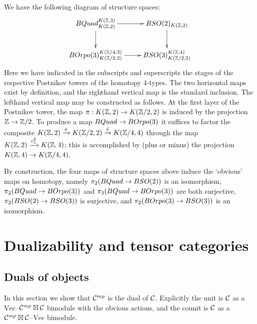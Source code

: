 \documentclass{amsart}
\begin{document}
We have the following diagram of structure spaces:
\begin{equation} \nn
\xymatrix{
BQuad_{K(\ZZ,2)}^{K(\ZZ,3)} \ar[r] \ar[d] & BSO(2)_{K(\ZZ,2)} \ar[d] \\
BOrpo(3)_{K(\ZZ/2,2)}^{K(\ZZ/4,3)} \ar[r] & BSO(3)_{K(\ZZ/2,2)}^{K(\ZZ,4)}
}
\end{equation}
Here we have indicated in the subscripts and superscripts the stages of the respective Postnikov towers of the homotopy 4-types.  The two horizontal maps exist by definition, and the righthand vertical map is the standard inclusion.  The lefthand vertical map may be constructed as follows.  At the first layer of the Postnikov tower, the map $\pi: K(\mathbb Z,2) \rightarrow K(\mathbb Z/2,2)$ is induced by the projection $\mathbb Z \rightarrow \mathbb Z/2$.  To produce a map $BQuad \rightarrow BOrpo(3)$ it suffices to factor the composite $K(\mathbb Z,2) \xrightarrow{\pi} K(\mathbb Z/2,2) \xrightarrow{\delta} K(\mathbb Z/4,4)$ through the map $K(\mathbb Z,2) \xrightarrow{c_1^2} K(\mathbb Z,4)$; this is accomplished by (plus or minus) the projection $K(\mathbb Z,4) \rightarrow K(\mathbb Z/4,4)$.  %

By construction, the four maps of structure spaces above induce the `obvious' maps on homotopy, namely $\pi_2(BQuad \rightarrow BSO(2))$ is an isomorphism, $\pi_2(BQuad \rightarrow BOrpo(3))$ and $\pi_3(BQuad \rightarrow BOrpo(3))$ are both surjective, $\pi_2(BSO(2) \rightarrow BSO(3))$ is surjective, and $\pi_2(BOrpo(3) \rightarrow BSO(3))$ is an isomorphism.  



\section{Dualizability and tensor categories} \label{sec-dualfusion}

\subsection{Duals of objects} \label{sec-df-objects}

In this section we show that $\mathcal C^{mp}$ is the dual of $\mathcal C$.  Explicitly the unit is $\mathcal C$ as a $\mathrm{Vec}$--$\mathcal C^{mp} \boxtimes \mathcal C$ bimodule with the obvious actions, and the counit is $\mathcal C$ as a $\mathcal C^{mp} \boxtimes \mathcal C$--$\mathrm{Vec}$ bimodule.
\end{document}
